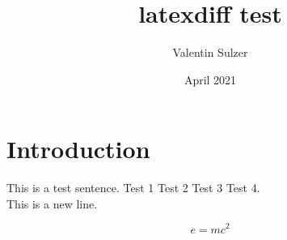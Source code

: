 \documentclass{article}
\title{latexdiff test}
\author{Valentin Sulzer}
\date{April 2021}
\begin{document}
\maketitle

\section{Introduction}

This is a test sentence.
Test 1
Test 2
Test 3
Test 4.
\\This is a new line.

\begin{equation}
    e = mc^2
\end{equation}
\end{document}
